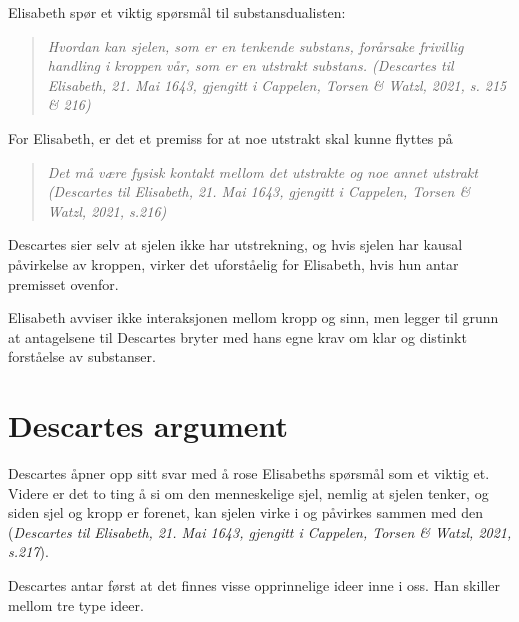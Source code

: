 \documentclass[12pt, a4paper]{article}
\begin{document}
\begin{flushleft}
    Elisabeth spør et viktig spørsmål til substansdualisten:
\end{flushleft}
\begin{quote}
    \textit{Hvordan kan sjelen, som er en tenkende substans, forårsake frivillig handling i kroppen vår, som er en utstrakt substans. (\textit{Descartes til Elisabeth, 21. Mai 1643, gjengitt i Cappelen, Torsen \& Watzl, 2021, s. 215 \& 216})}
\end{quote}

\begin{flushleft}
    For Elisabeth, er det et premiss for at noe utstrakt skal kunne flyttes på
\end{flushleft}

\begin{quote}
    \textit{Det må være fysisk \textit{kontakt} mellom det utstrakte og noe annet utstrakt (\textit{Descartes til Elisabeth, 21. Mai 1643, gjengitt i Cappelen, Torsen \& Watzl, 2021, s.216})}
\end{quote}

\begin{flushleft}
    Descartes sier selv at sjelen ikke har utstrekning, og hvis sjelen har kausal påvirkelse av kroppen, virker det uforståelig for Elisabeth, hvis hun antar premisset ovenfor.
\end{flushleft}

\begin{flushleft}
    Elisabeth avviser ikke interaksjonen mellom kropp og sinn, men legger til grunn at antagelsene til Descartes bryter med hans egne krav om klar og distinkt forståelse av substanser.
\end{flushleft}



\section{Descartes argument}

\begin{flushleft}
    Descartes åpner opp sitt svar med å rose Elisabeths spørsmål som et viktig et. Videre er det to ting å si om den menneskelige sjel, nemlig at sjelen tenker, og siden sjel og kropp er forenet, kan sjelen virke i og påvirkes sammen med den (\textit{Descartes til Elisabeth, 21. Mai 1643, gjengitt i Cappelen, Torsen \& Watzl, 2021, s.217}). 
\end{flushleft}

\begin{flushleft}
    Descartes antar først at det finnes visse opprinnelige ideer inne i oss. Han skiller mellom tre type ideer.
\end{flushleft}
\end{document}
